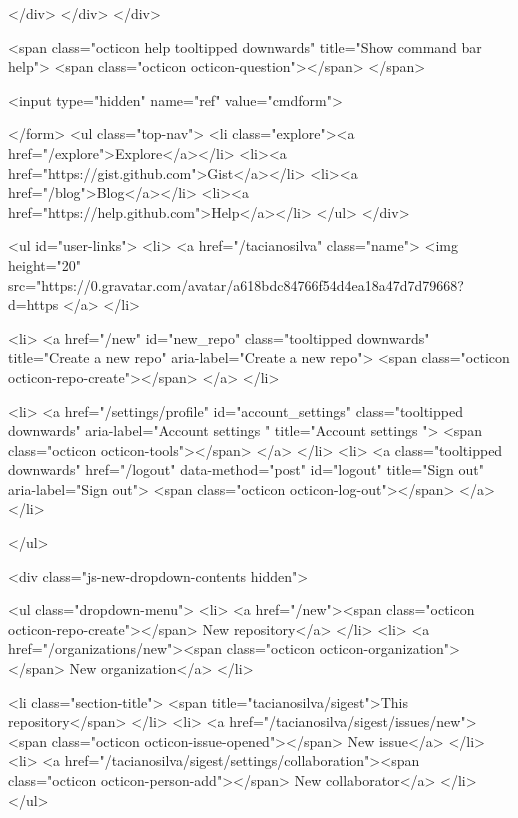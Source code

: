         </div>
      </div>
    </div>

  <span class="octicon help tooltipped downwards" title="Show command bar help">
    <span class="octicon octicon-question"></span>
  </span>


  <input type="hidden" name="ref" value="cmdform">

</form>
        <ul class="top-nav">
          <li class="explore"><a href="/explore">Explore</a></li>
            <li><a href="https://gist.github.com">Gist</a></li>
            <li><a href="/blog">Blog</a></li>
          <li><a href="https://help.github.com">Help</a></li>
        </ul>
      </div>

    


  <ul id="user-links">
    <li>
      <a href="/tacianosilva" class="name">
        <img height="20" src="https://0.gravatar.com/avatar/a618bdc84766f54d4ea18a47d7d79668?d=https%
      </a>
    </li>

      <li>
        <a href="/new" id="new_repo" class="tooltipped downwards" title="Create a new repo" aria-label="Create a new repo">
          <span class="octicon octicon-repo-create"></span>
        </a>
      </li>

      <li>
        <a href="/settings/profile" id="account_settings"
          class="tooltipped downwards"
          aria-label="Account settings "
          title="Account settings ">
          <span class="octicon octicon-tools"></span>
        </a>
      </li>
      <li>
        <a class="tooltipped downwards" href="/logout" data-method="post" id="logout" title="Sign out" aria-label="Sign out">
          <span class="octicon octicon-log-out"></span>
        </a>
      </li>

  </ul>

<div class="js-new-dropdown-contents hidden">
  

<ul class="dropdown-menu">
  <li>
    <a href="/new"><span class="octicon octicon-repo-create"></span> New repository</a>
  </li>
  <li>
    <a href="/organizations/new"><span class="octicon octicon-organization"></span> New organization</a>
  </li>



    <li class="section-title">
      <span title="tacianosilva/sigest">This repository</span>
    </li>
      <li>
        <a href="/tacianosilva/sigest/issues/new"><span class="octicon octicon-issue-opened"></span> New issue</a>
      </li>
      <li>
        <a href="/tacianosilva/sigest/settings/collaboration"><span class="octicon octicon-person-add"></span> New collaborator</a>
      </li>
</ul>

